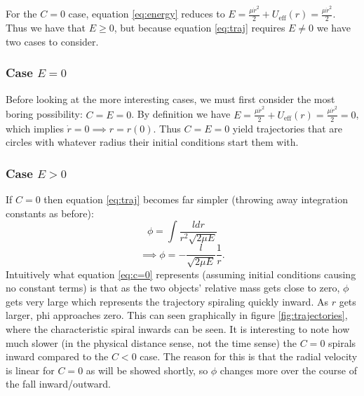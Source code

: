 \documentclass[letterpaper, reqno,11pt]{article}
\begin{document}
For the $C=0$ case, equation \ref{eq:energy} reduces to $E=\frac{\mu \dot r^2}{2}+U_{\text{eff}}(r)=\frac{\mu\dot r^2}{2}$. Thus we have that $E\geq0$, but because equation \ref{eq:traj} requires $E\neq 0$ we have two cases to consider. 

\subsubsection{Case $E=0$}

Before looking at the more interesting cases, we must first consider the most boring possibility: $C=E=0$. By definition we have $E=\frac{\mu \dot r^2}{2}+U_{\text{eff}}(r)=\frac{\mu\dot r^2}{2}=0$, which implies $\dot r=0\implies r=r(0)$. Thus $C=E=0$ yield trajectories that are circles with whatever radius their initial conditions start them with. %

\subsubsection{Case $E> 0$}

If $C=0$ then equation \ref{eq:traj} becomes far simpler (throwing away integration constants as before): 
\[
\phi = \int \frac{ldr}{r^2\sqrt{2\mu E} }
\]
\begin{equation}\label{eq:c=0}
\implies\phi=-\frac{l}{\sqrt{2\mu E} } \frac{1}{r}
.\end{equation}
Intuitively what equation \ref{eq:c=0} represents (assuming initial conditions causing no constant terms) is that as the two objects' relative mass gets close to zero, $\phi$ gets very large which represents the trajectory spiraling quickly inward. As $r$ gets larger, phi approaches zero. This can seen graphically in figure \ref{fig:trajectories}, where the characteristic spiral inwards can be seen. It is interesting to note how much slower (in the physical distance sense, not the time sense) the $C=0$ spirals inward compared to the $C<0$ case. The reason for this is that the radial velocity is linear for $C=0$ as will be showed shortly, so $\phi$ changes more over the course of the fall inward/outward. 
\end{document}
